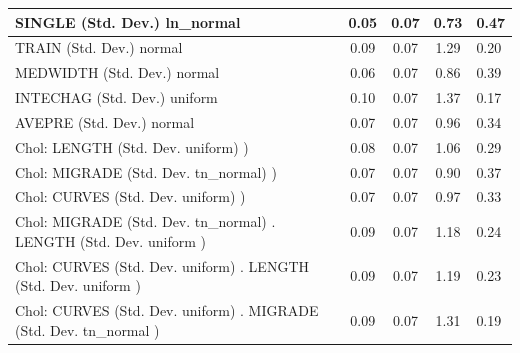 \begin{table}
\begin{center}
\begin{tabular}{|l|l|c|c|c|l|}
			\hline
			SINGLE (Std. Dev.) ln_normal &  & 0.05 & 0.07 & 0.73 & 0.47 \\
			\hline
			TRAIN (Std. Dev.) normal &  & 0.09 & 0.07 & 1.29 & 0.20 \\
			\hline
			MEDWIDTH (Std. Dev.) normal &  & 0.06 & 0.07 & 0.86 & 0.39 \\
			\hline
			INTECHAG (Std. Dev.) uniform &  & 0.10 & 0.07 & 1.37 & 0.17 \\
			\hline
			AVEPRE (Std. Dev.) normal &  & 0.07 & 0.07 & 0.96 & 0.34 \\
			\hline
			 Chol: LENGTH (Std. Dev. uniform) ) &  & 0.08 & 0.07 & 1.06 & 0.29 \\
			\hline
			 Chol: MIGRADE (Std. Dev. tn_normal) ) &  & 0.07 & 0.07 & 0.90 & 0.37 \\
			\hline
			 Chol: CURVES (Std. Dev. uniform) ) &  & 0.07 & 0.07 & 0.97 & 0.33 \\
			\hline
			 Chol: MIGRADE (Std. Dev. tn_normal) . LENGTH (Std. Dev.   uniform ) &  & 0.09 & 0.07 & 1.18 & 0.24 \\
			\hline
			 Chol: CURVES (Std. Dev. uniform) . LENGTH (Std. Dev.   uniform ) &  & 0.09 & 0.07 & 1.19 & 0.23 \\
			\hline
			 Chol: CURVES (Std. Dev. uniform) . MIGRADE (Std. Dev.   tn_normal ) &  & 0.09 & 0.07 & 1.31 & 0.19 \\
			\hline
		\end{tabular}
	\end{center}
\end{table}